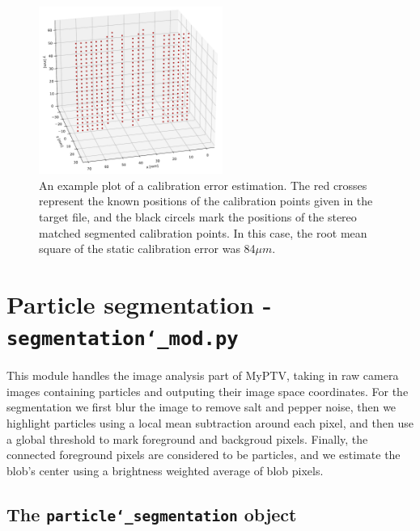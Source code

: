 \documentclass[10pt,a4paper]{article}
\begin{document}
\begin{figure}
	\centering
	\includegraphics[width=6cm]{cal_error.pdf}
	\caption{An example plot of a calibration error estimation. The red crosses represent the known positions of the calibration points given in the target file, and the black circels mark the positions of the stereo matched segmented calibration points. In this case, the root mean square of the static calibration error was 84$\mu m$. \label{fig:cal_err}}
\end{figure}










\section{Particle segmentation - \texttt{segmentation\char`_mod.py}} 


This module handles the image analysis part of MyPTV, taking in raw camera images containing particles and outputing their image space coordinates. For the segmentation we first blur the image to remove salt and pepper noise, then we highlight particles using a local mean subtraction around each pixel, and then use a global threshold to mark foreground and backgroud pixels. Finally, the connected foreground pixels are considered to be particles, and we estimate the blob's center using a brightness weighted average of blob pixels.



\subsection{The \texttt{particle\char`_segmentation} object} 
\end{document}
